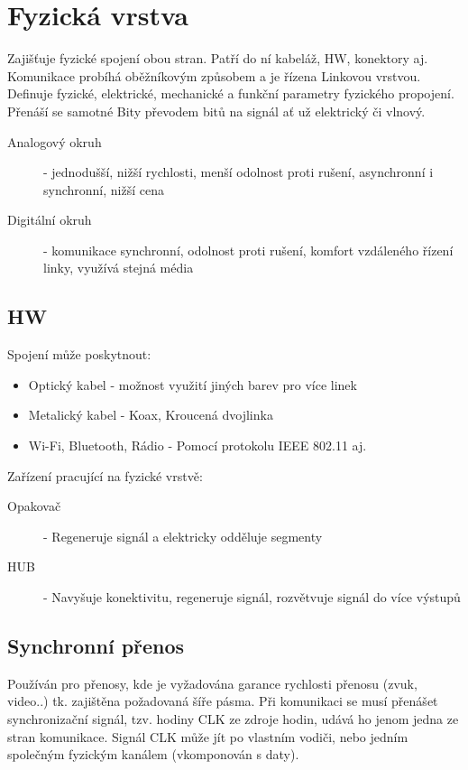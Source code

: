 \section{Fyzická vrstva}
Zajišťuje fyzické spojení obou stran.
Patří do ní kabeláž, HW, konektory aj.
Komunikace probíhá oběžníkovým způsobem a je řízena Linkovou vrstvou.
Definuje fyzické, elektrické, mechanické a funkční parametry fyzického propojení.
Přenáší se samotné Bity převodem bitů na signál ať už elektrický či vlnový.\\
\begin{description}
  \item[Analogový okruh]- jednodušší, nižší rychlosti, menší odolnost proti rušení, asynchronní i synchronní, nižší cena
  \item[Digitální okruh]- komunikace synchronní, odolnost proti rušení, komfort vzdáleného řízení linky, využívá stejná média\\
\end{description}
\subsection{HW}
Spojení může poskytnout:
\begin{itemize}
  \item Optický kabel - možnost využití jiných barev pro více linek
  \item Metalický kabel - Koax, Kroucená dvojlinka
  \item Wi-Fi, Bluetooth, Rádio - Pomocí protokolu IEEE 802.11 aj.\\
\end{itemize}
Zařízení pracující na fyzické vrstvě:
\begin{description}
  \item[Opakovač]- Regeneruje signál a elektricky odděluje segmenty
  \item[HUB]- Navyšuje konektivitu, regeneruje signál, rozvětvuje signál do více výstupů\\
\end{description}
\subsection{Synchronní přenos}
Používán pro přenosy, kde je vyžadována garance rychlosti přenosu (zvuk, video..) tk. zajištěna požadovaná šíře pásma.
Při komunikaci se musí přenášet synchronizační signál, tzv. hodiny CLK ze zdroje hodin, udává ho jenom jedna ze stran komunikace.
Signál CLK může jít po vlastním vodiči, nebo jedním společným fyzickým kanálem (vkomponován s daty).
